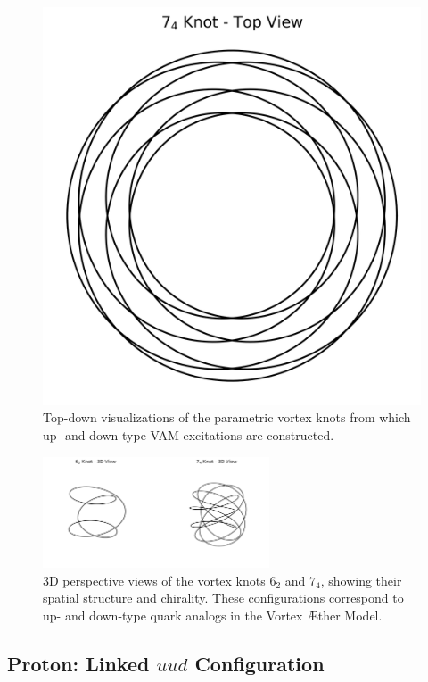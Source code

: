 \documentclass[12pt]{article}
\begin{document}
\begin{figure}[H]
\begin{minipage}{0.25\textwidth}
            \includegraphics[width=\textwidth]{images/knot_7_4_topview.png}
\end{minipage}
     \caption{Top-down visualizations of the parametric vortex knots from which up- and down-type VAM excitations are constructed.}
\end{figure}


\begin{figure}[H]
    \centering
    \includegraphics[width=0.6\textwidth]{images/knots_6_2_and_7_4_3D}
    \caption{3D perspective views of the vortex knots \(6_2\) and \(7_4\), showing their spatial structure and chirality. These configurations correspond to up- and down-type quark analogs in the Vortex \AE ther Model.}
\end{figure}


\subsection{Proton: Linked \(uud\) Configuration}
\end{document}
